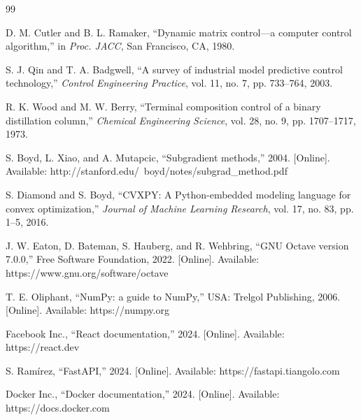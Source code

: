 \documentclass[conference]{IEEEtran}
\begin{document}
\begin{thebibliography}{99}

 D. M. Cutler and B. L. Ramaker, ``Dynamic matrix control—a computer control algorithm,'' in \textit{Proc. JACC}, San Francisco, CA, 1980.

 S. J. Qin and T. A. Badgwell, ``A survey of industrial model predictive control technology,'' \textit{Control Engineering Practice}, vol. 11, no. 7, pp. 733–764, 2003.

 R. K. Wood and M. W. Berry, ``Terminal composition control of a binary distillation column,'' \textit{Chemical Engineering Science}, vol. 28, no. 9, pp. 1707–1717, 1973.

 S. Boyd, L. Xiao, and A. Mutapcic, ``Subgradient methods,'' 2004. [Online]. Available: http://stanford.edu/~boyd/notes/subgrad\_method.pdf

 S. Diamond and S. Boyd, ``CVXPY: A Python-embedded modeling language for convex optimization,'' \textit{Journal of Machine Learning Research}, vol. 17, no. 83, pp. 1–5, 2016.

 J. W. Eaton, D. Bateman, S. Hauberg, and R. Wehbring, ``GNU Octave version 7.0.0,'' Free Software Foundation, 2022. [Online]. Available: https://www.gnu.org/software/octave

 T. E. Oliphant, ``NumPy: a guide to NumPy,'' USA: Trelgol Publishing, 2006. [Online]. Available: https://numpy.org

 Facebook Inc., ``React documentation,'' 2024. [Online]. Available: https://react.dev

 S. Ramírez, ``FastAPI,'' 2024. [Online]. Available: https://fastapi.tiangolo.com

 Docker Inc., ``Docker documentation,'' 2024. [Online]. Available: https://docs.docker.com

\end{thebibliography}
\end{document}
